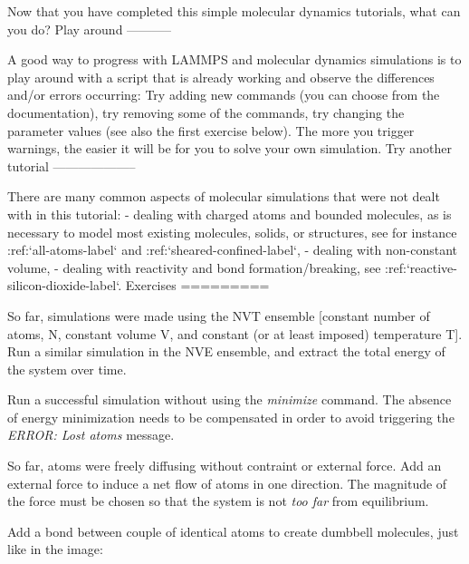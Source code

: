 \vspace{0.5cm} \noindent Now that you have completed this simple molecular dynamics tutorials, what can you do?
Play around
-----------

\vspace{0.5cm} \noindent A good way to progress with LAMMPS and molecular dynamics
simulations is to play around with a script that is already
working and observe the differences and/or errors occurring:
Try adding new commands (you can choose from the documentation),
try removing some of the commands, try changing the parameter values
(see also the first exercise below).
The more you trigger warnings, the easier it will be for you to solve your
own simulation.
Try another tutorial
--------------------

\vspace{0.5cm} \noindent There are many common aspects of molecular simulations that were not dealt with in this
tutorial:
- dealing with charged atoms and bounded molecules, as is necessary to model most existing molecules, solids, or structures, see for instance :ref:`all-atoms-label` and :ref:`sheared-confined-label`,
- dealing with non-constant volume,
- dealing with reactivity and bond formation/breaking, see :ref:`reactive-silicon-dioxide-label`.
Exercises
=========

\vspace{0.5cm} \noindent So far, simulations were made using the NVT ensemble [constant number 
of atoms, N, constant volume V, and constant (or at least imposed)
temperature T].
Run a similar simulation in the NVE ensemble, and extract the
total energy of the system over time.

\vspace{0.5cm} \noindent Run a successful simulation without using the \textit{minimize} command.
The absence of energy minimization needs to be compensated
in order to avoid triggering the \textit{ERROR: Lost atoms} message.

\vspace{0.5cm} \noindent So far, atoms were freely diffusing without contraint or external force.
Add an external force to induce a net flow of atoms in one
direction. The magnitude of the force must be chosen so
that the system is not \textit{too far} from equilibrium.

\vspace{0.5cm} \noindent Add a bond between couple of identical atoms to create
dumbbell molecules, just like in the image:
